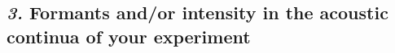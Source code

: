 \documentclass[12pt, english]{article}
\begin{document}

\subsection*{\emph{3.} Formants and/or intensity in the acoustic continua of your experiment}
\vspace{10pt}
\end{document}
